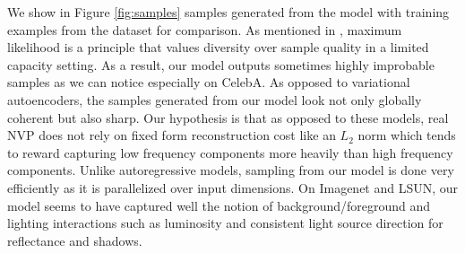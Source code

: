 \documentclass{article}
\newcommand{\jcom}[1]{\textcolor{darkgreen}{[jascha: #1]}}
\begin{document}
We show in Figure \ref{fig:samples} samples generated from the model with training examples from the dataset for comparison. As mentioned in \citep{DBLP:journals/corr/TheisOB15, gregor2016towards}, maximum likelihood is a principle that values diversity over sample quality in a limited capacity setting. As a result, our model outputs sometimes highly improbable samples as we can notice especially on CelebA. As opposed to variational autoencoders, the samples generated from our model look not only globally coherent but also sharp. Our hypothesis is that as opposed to these models, real NVP does not rely on fixed form reconstruction cost like an $L_{2}$ norm which tends to reward capturing low frequency components more heavily than high frequency components. Unlike autoregressive models, sampling from our model is done very efficiently as it is parallelized over input dimensions. %
On Imagenet and LSUN, our model seems to have captured well the notion of background/foreground and lighting interactions such as luminosity and consistent light source direction for reflectance and shadows. %
\end{document}
